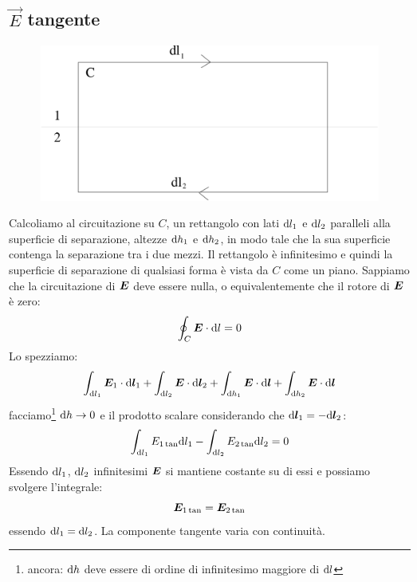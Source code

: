 \subsection{$\vec E$ tangente}
\begin{figure}[htbp]
\centering
\includegraphics[scale=0.5]{immagini/fisica2/contornoEB2}
\end{figure}
Calcoliamo al circuitazione su $C$, un rettangolo con lati $\mathrm{d} l_1$ e $\mathrm{d} l_2$ paralleli alla superficie di separazione, altezze $\mathrm{d} h_1$ e $\mathrm{d} h_2$, in modo tale che la sua superficie contenga la separazione tra i due mezzi. Il rettangolo è infinitesimo e quindi la superficie di separazione di qualsiasi forma è vista da $C$ come un piano. Sappiamo che la circuitazione di $\boldsymbol{E}$ deve essere nulla, o equivalentemente che il rotore di $\boldsymbol{E}$ è zero:
\begin{equation}
\oint_C\boldsymbol{E}\cdot \mathrm{d} l=0
\end{equation}
Lo spezziamo:
\begin{equation}
\int_{\mathrm{d} l_1}\boldsymbol{E}_1\cdot\mathrm{d}\boldsymbol{l}_1+\int_{\mathrm{d} l_2}\boldsymbol{E}\cdot\mathrm{d}\boldsymbol{l}_2+\int_{\mathrm{d} h_1}\boldsymbol{E}\cdot\mathrm{d}\boldsymbol{l}+\int_{\mathrm{d} h_2}\boldsymbol{E}\cdot\mathrm{d}\boldsymbol{l}
\end{equation}
facciamo\footnote{ancora: $\mathrm{d} h$ deve essere di ordine di infinitesimo maggiore di $\mathrm{d} l$} $\mathrm{d} h\to 0$ e il prodotto scalare considerando che $\mathrm{d}\boldsymbol{l}_1=-\mathrm{d}\boldsymbol{l}_2$:
\begin{equation}
\int_{\mathrm{d} l_1}E_{1\tan}\mathrm{d} l_1-\int_{\mathrm{d} l_2}E_{2\tan}\mathrm{d} l_2=0
\end{equation}
Essendo $\mathrm{d} l_1$, $\mathrm{d} l_2$ infinitesimi $\boldsymbol{E}$ si mantiene costante su di essi e possiamo svolgere l'integrale:
\begin{equation}
\boldsymbol{E}_{1\tan}=\boldsymbol{E}_{2\tan}
\end{equation}
essendo $\mathrm{d} l_1=\mathrm{d} l_2$. La componente tangente varia con continuità.

